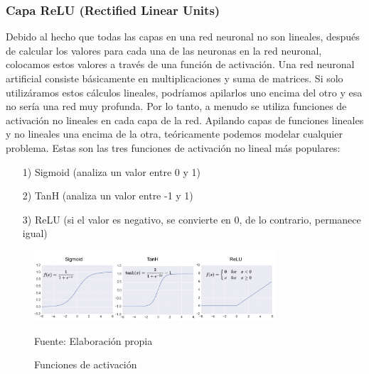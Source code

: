 	\subsubsection  {Capa ReLU (Rectified Linear Units)}
		\vskip -0.2cm 
		Debido al hecho que todas las capas en una red neuronal no son lineales, después de calcular los valores para cada una de las neuronas en la red neuronal, colocamos estos valores a través de una función de activación. Una red neuronal artificial consiste básicamente en multiplicaciones y suma de matrices. Si solo utilizáramos estos cálculos lineales, podríamos apilarlos uno encima del otro y esa no sería una red muy profunda. Por lo tanto, a menudo se utiliza funciones de activación no lineales en cada capa de la red. Apilando capas de funciones lineales y no lineales una encima de la otra, teóricamente podemos modelar cualquier problema.
		\vskip 0.2cm 
		Estas son las tres funciones de activación no lineal más populares:
		\begin{enumerate}
		\item[1)] Sigmoid (analiza un valor entre 0 y 1)  \vspace{-0.5em}
		\item[2)] TanH (analiza un valor entre -1 y 1) \vspace{-0.5em}
		\item[3)] ReLU (si el valor es negativo, se convierte en 0, de lo contrario, permanece igual) \vspace{-0.5em}
		\end{enumerate}

		\begin{figure}[H]
		\begin{center}
		\includegraphics[width=0.8\textwidth]{images/marcoteorico/activfunct}
		\end{center}
		\begin{center}
		\caption{\small{Funciones de activación}}
		\vskip -0.2cm  
		{\small{Fuente: Elaboración propia}}
		\end{center}
		\vspace{-1.5em}
		\end{figure}

